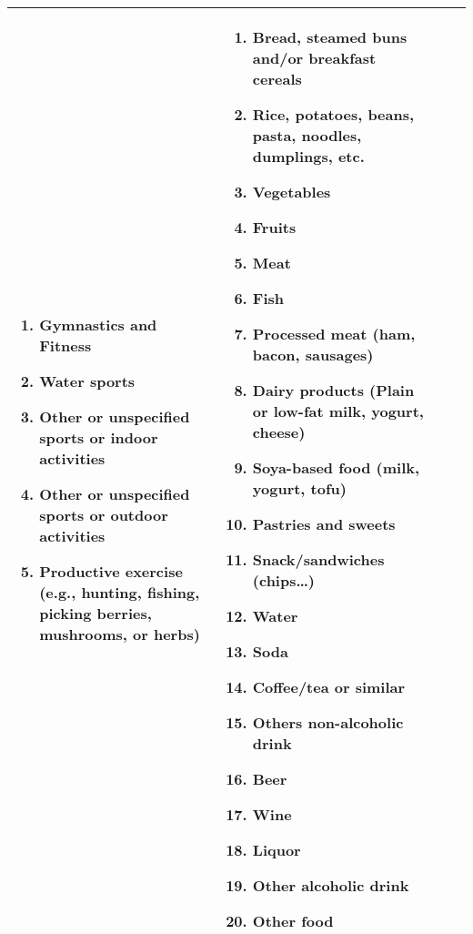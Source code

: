 \begin{tabularx}{0.97\textwidth}{XXXX}
\begin{enumerate}[leftmargin=*]
        \item Gymnastics and Fitness
        \item Water sports
        \item Other or unspecified sports or indoor activities
        \item Other or unspecified sports or outdoor activities
        \item Productive exercise (e.g., hunting, fishing, picking berries, mushrooms, or herbs)
    \end{enumerate}&
    \begin{enumerate}[leftmargin=*]
        \item Bread, steamed buns and/or breakfast cereals
        \item Rice, potatoes, beans, pasta, noodles, dumplings, etc.
        \item Vegetables
        \item Fruits
        \item Meat
        \item Fish
        \item Processed meat (ham, bacon, sausages)
        \item Dairy products (Plain or low-fat milk, yogurt, cheese)
        \item Soya-based food (milk, yogurt, tofu)
        \item Pastries and sweets
        \item Snack/sandwiches (chips\dots)
        \item Water
        \item Soda
        \item Coffee/tea or similar
        \item Others non-alcoholic drink
        \item Beer
        \item Wine
        \item Liquor
        \item Other alcoholic drink
        \item Other food
    \end{enumerate}
    \\
    \bottomrule
\end{tabularx}

